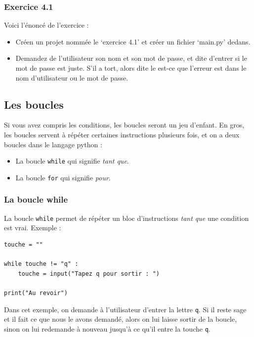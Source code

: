 \documentclass[12pt]{article}
\newcommand{\code}[1]{\colorbox{light-gray}{\texttt{#1}}}
\def\abIconQuestion{\symbol{"F059}}
\newcommand{\questionbox}[1]{%
  \awesomebox{\abIconQuestion}{\aweboxrulewidth}{abwarning}{#1}}
\begin{document}
        \subsubsection{Exercice 4.1}
            Voici l'énoncé de l'exercice :
            \begin{itemize}
                \item Créen un projet nommée le `exercice 4.1' et créer un fichier `main.py' dedans.
                \item Demandez de l'utilisateur son nom et son mot de passe, et dite d'entrer si le mot de passe est
                    juste. S'il a tort, alors dite le est-ce que l'erreur est dans le nom d'utilisateur ou le mot
                    de passe.
            \end{itemize}

\clearpage

    \subsection{Les boucles}
        Si vous avez compris les conditions, les boucles seront un jeu d'enfant. En gros, les boucles servent à répéter
        certaines instructions plusieurs fois, et on a deux boucles dans le langage python :
        \begin{itemize}
            \item La boucle \code{while} qui signifie \emph{tant que}.
            \item La boucle \code{for} qui signifie \emph{pour}.
        \end{itemize}


        \subsubsection{La boucle while}

            La boucle \code{while} permet de répéter un bloc d'instructions \emph{tant que} une condition est vrai.
            Exemple :
            \begin{lstlisting}[style=code]
touche = ""

while touche != "q" :
    touche = input("Tapez q pour sortir : ")

print("Au revoir")
            \end{lstlisting}

            Dans cet exemple, on demande à l'utilisateur d'entrer la lettre \code{q}. Si il reste sage et il fait
            ce que nous le avons demandé, alors on lui laisse sortir de la boucle, sinon on lui redemande à nouveau
            jusqu'à ce qu'il entre la touche \code{q}.
\end{document}
